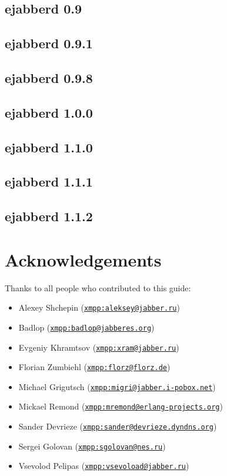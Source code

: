 \documentclass[a4paper,10pt]{article}
\gdef\ahrefurl#1{\href{#1}{\texttt{#1}}}
\begin{document}
\subsection{ejabberd 0.9}


\subsection{ejabberd 0.9.1}


\subsection{ejabberd 0.9.8}


\subsection{ejabberd 1.0.0}


\subsection{ejabberd 1.1.0}


\subsection{ejabberd 1.1.1}


\subsection{ejabberd 1.1.2}


\section{Acknowledgements}
\label{acknowledgements}
Thanks to all people who contributed to this guide:
\begin{itemize}
\item Alexey Shchepin (\ahrefurl{xmpp:aleksey@jabber.ru})
\item Badlop (\ahrefurl{xmpp:badlop@jabberes.org})
\item Evgeniy Khramtsov (\ahrefurl{xmpp:xram@jabber.ru})
\item Florian Zumbiehl (\ahrefurl{xmpp:florz@florz.de})
\item Michael Grigutsch (\ahrefurl{xmpp:migri@jabber.i-pobox.net})
\item Mickael Remond (\ahrefurl{xmpp:mremond@erlang-projects.org})
\item Sander Devrieze (\ahrefurl{xmpp:sander@devrieze.dyndns.org})
\item Sergei Golovan (\ahrefurl{xmpp:sgolovan@nes.ru})
\item Vsevolod Pelipas (\ahrefurl{xmpp:vsevoload@jabber.ru})
\end{itemize}
\end{document}
